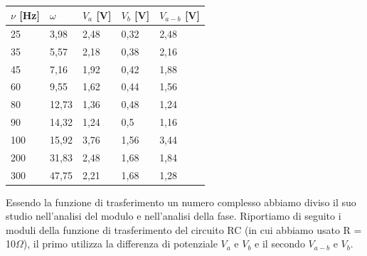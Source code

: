 \begin{table}[!ht]
    \centering
    \begin{tabular}{lllll}
    \toprule
        $\nu$ [Hz]  & $\omega$ & $V_a$ [V] & $V_b$ [V] & $V_{a-b}$ [V]  \\ 
        \midrule
        25  & 3,98  & 2,48 & 0,32 & 2,48  \\ 
        35  & 5,57  & 2,18 & 0,38 & 2,16  \\ 
        45  & 7,16  & 1,92 & 0,42 & 1,88  \\ 
        60  & 9,55  & 1,62 & 0,44 & 1,56  \\ 
        80  & 12,73  & 1,36 & 0,48 & 1,24  \\ 
        90  & 14,32  & 1,24 & 0,5 & 1,16  \\ 
        100  & 15,92  & 3,76 & 1,56 & 3,44  \\ 
        200  & 31,83  & 2,48 & 1,68 & 1,84  \\ 
        300  & 47,75  & 2,21 & 1,68 & 1,28  \\ 
        \bottomrule
    \end{tabular}
    \caption{}
    \label{tabella 1}
\end{table}


Essendo la funzione di trasferimento un numero complesso abbiamo diviso il suo studio nell’analisi del modulo e nell’analisi della fase.
Riportiamo di seguito i moduli della funzione di trasferimento del circuito RC (in cui abbiamo 
usato R = 10$\Omega$), il primo utilizza la differenza di potenziale $V_{a}$ e $V_{b}$ e il secondo $V_{a-b}$ e $V_{b}$.


